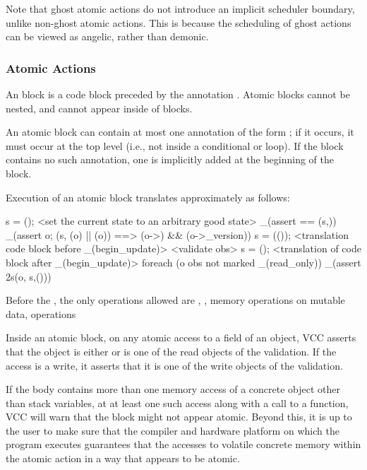 \documentclass[preprint,nocopyrightspace]{sigplanconf}
\begin{document}
{{{{\begin{VCC}
Note that ghost atomic actions do not introduce an implicit scheduler
boundary, unlike non-ghost atomic actions. This is because the
scheduling of ghost actions can be viewed as angelic, rather than
demonic.

\subsubsection{Atomic Actions}

An  block is a code block preceded by the
annotation . Atomic blocks cannot be nested, and
cannot appear inside of  blocks. 

An atomic block can contain at most one annotation of the
form ; if it occurs, it must occur at the top
level (i.e., not inside a conditional or loop). If the block contains
no such annotation, one is implicitly added at the beginning of the
block. 

Execution of an atomic block translates approximately as follows:
\begin{VCC}
\state s = \now();
<set the current state to an arbitrary good state>
_(assert \me == \at(s,\me))
_(assert \forall \object o; \at(s, \wrapped(o) || \mutable(o))
    ==> \unchanged(o->\version) && \unchanged(o->\volatile_version))
s = \stutter(\now());
<translation code block before _(begin_update)>
<validate obs>
s = \now();
<translation of code block after _(begin_update)>
foreach (\object o \in obs not marked _(read_only))
  _(assert \inv2s(o, s,\now()))
\end{VCC}

Before the , the only operations allowed
are , , memory operations on mutable data,
 operations 

Inside an atomic block, on any atomic access to a field of an object,
VCC asserts that the object is either \vcc{\mutable} or is one of the
read objects of the validation. If the access is a write, it asserts
that it is one of the write objects of the validation.

If the body contains more than one memory access of a concrete object
other than stack variables, at at least one such access along with a
call to a  function, VCC will warn that the block might
not appear atomic. Beyond this, it is up to the user to make sure that the
compiler and hardware platform on which the program executes guarantees that 
the accesses to volatile concrete memory within the
atomic action in a way that appears to be atomic. 


\end{VCC}}}}}
\end{document}
